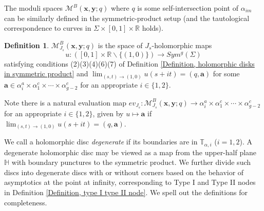 \documentclass{amsart}
\theoremstyle{definition}
\newtheorem{defn}[thm]{Definition}
\theoremstyle{remark}
\numberwithin{equation}{section}
\numberwithin{equation}{section} \makeatletter
\begin{document}
The moduli spaces $\mathcal{M}^B(\bm{x},\bm{y};q)$ where $q$ is some self-intersection point of $\alpha_{im}$ can be similarly defined in the symmetric-product setup (and the tautological correspondence to curves in $\Sigma\times[0,1]\times\mathbb{R}$ holds).

\begin{defn}\label{Definition, moduli spaces with sharp turns}
$\mathcal{M}_{J_s}^B(\bm{x},\bm{y};q)$ is the space of $J_s$-holomorphic maps $$u:([0,1]\times \mathbb{R}\backslash \{(1,0)\})\rightarrow Sym^g(\Sigma)$$ satisfying conditions (2)(3)(4)(6)(7) of Definition \ref{Definition, holomorphic disks in symmetric product} and $\lim_{(s,t)\rightarrow(1,0)}u(s+it)=(q,\bm{a})$ for some $\bm{a}\in \alpha^a_i\times \alpha_1^c\times\cdots\times \alpha_{g-2}^c$ for an appropriate $i\in\{1,2\}$.
\end{defn}
Note there is a natural evaluation map $ev_{J_s}:\mathcal{M}^B_{J_s}(\bm{x},\bm{y};q)\rightarrow \alpha^a_i\times\alpha_1^c\times\cdots\times \alpha_{g-2}^c$ for an appropriate $i\in\{1,2\}$, given by $u\mapsto \bm{a}$ if $\lim_{(s,t)\rightarrow(1,0)}u(s+it)=(q,\bm{a})$. 

 We call a holomorphic disc \emph{degenerate} if its boundaries are in $\mathbb{T}_{\alpha,i}$ ($i=1,2$). A degenerate holomorphic disc may be viewed as a map from the upper-half plane $\mathbb{H}$ with boundary punctures to the symmetric product. We further divide such discs into degenerate discs with or without corners based on the behavior of asymptotics at the point at infinity, corresponding to Type I and Type II nodes in Definition \ref{Definition, type I type II node}. We spell out the definitions for completeness. 
\end{document}
